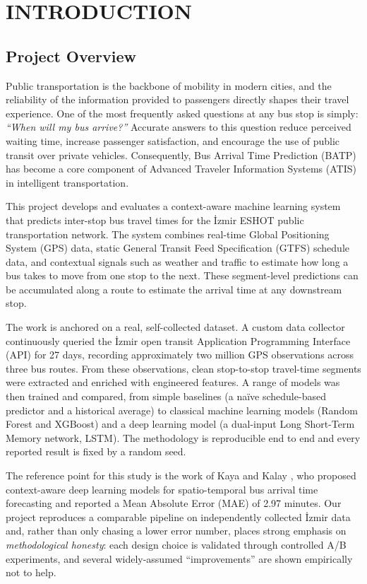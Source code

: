 \chapter{INTRODUCTION}

\section{Project Overview}

Public transportation is the backbone of mobility in modern cities, and the reliability of the information provided to passengers directly shapes their travel experience. One of the most frequently asked questions at any bus stop is simply: \textit{``When will my bus arrive?''} Accurate answers to this question reduce perceived waiting time, increase passenger satisfaction, and encourage the use of public transit over private vehicles. Consequently, Bus Arrival Time Prediction (BATP) has become a core component of Advanced Traveler Information Systems (ATIS) in intelligent transportation.

This project develops and evaluates a context-aware machine learning system that predicts inter-stop bus travel times for the İzmir ESHOT public transportation network. The system combines real-time Global Positioning System (GPS) data, static General Transit Feed Specification (GTFS) schedule data, and contextual signals such as weather and traffic to estimate how long a bus takes to move from one stop to the next. These segment-level predictions can be accumulated along a route to estimate the arrival time at any downstream stop.

The work is anchored on a real, self-collected dataset. A custom data collector continuously queried the İzmir open transit Application Programming Interface (API) for 27 days, recording approximately two million GPS observations across three bus routes. From these observations, clean stop-to-stop travel-time segments were extracted and enriched with engineered features. A range of models was then trained and compared, from simple baselines (a naïve schedule-based predictor and a historical average) to classical machine learning models (Random Forest and XGBoost) and a deep learning model (a dual-input Long Short-Term Memory network, LSTM). The methodology is reproducible end to end and every reported result is fixed by a random seed.

The reference point for this study is the work of Kaya and Kalay \cite{kaya2025}, who proposed context-aware deep learning models for spatio-temporal bus arrival time forecasting and reported a Mean Absolute Error (MAE) of 2.97 minutes. Our project reproduces a comparable pipeline on independently collected İzmir data and, rather than only chasing a lower error number, places strong emphasis on \textit{methodological honesty}: each design choice is validated through controlled A/B experiments, and several widely-assumed ``improvements'' are shown empirically not to help.

